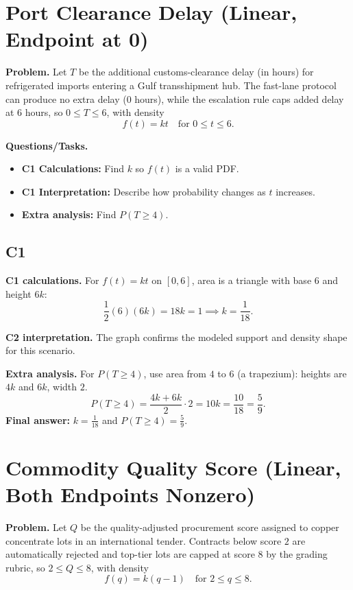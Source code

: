 	\section{Port Clearance Delay (Linear, Endpoint at 0)}
	
	\textbf{Problem.}
	Let $T$ be the additional customs-clearance delay (in hours) for refrigerated imports entering a Gulf transshipment hub. The fast-lane protocol can produce no extra delay ($0$ hours), while the escalation rule caps added delay at $6$ hours, so $0\le T\le 6$, with density
	\[
	f(t)=kt\quad\text{for }0\le t\le 6.
	\]
	
	\textbf{Questions/Tasks.}
	\begin{itemize}
		\item \textbf{C1 Calculations:} Find $k$ so $f(t)$ is a valid PDF.
		\item \textbf{C1 Interpretation:} Describe how probability changes as $t$ increases.
		\item \textbf{Extra analysis:} Find $P(T\ge 4)$.
	\end{itemize}

	\subsection*{C1}

\textbf{C1 calculations.}
For $f(t)=kt$ on $[0,6]$, area is a triangle with base $6$ and height $6k$:
	\[
	\frac12(6)(6k)=18k=1\implies k=\frac1{18}.
	\]

\textbf{C2 interpretation.}
The graph confirms the modeled support and density shape for this scenario.

\textbf{Extra analysis.}
For $P(T\ge4)$, use area from $4$ to $6$ (a trapezium): heights are $4k$ and $6k$, width $2$.
\[
P(T\ge4)=\frac{4k+6k}{2}\cdot2=10k=\frac{10}{18}=\frac59.
\]
\textbf{Final answer:} $k=\frac1{18}$ and $P(T\ge4)=\frac59$.
	\section{Commodity Quality Score (Linear, Both Endpoints Nonzero)}
	
	\textbf{Problem.}
	Let $Q$ be the quality-adjusted procurement score assigned to copper concentrate lots in an international tender. Contracts below score $2$ are automatically rejected and top-tier lots are capped at score $8$ by the grading rubric, so $2\le Q\le 8$, with density
	\[
	f(q)=k(q-1)\quad\text{for }2\le q\le 8.
	\]
	
